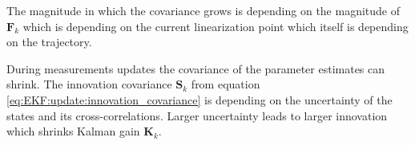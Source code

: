 \documentclass[10pt,a4paper]{article}
\renewcommand{\d}[1]{\ensuremath{\operatorname{d}\!{#1}}}
\begin{document}
The magnitude in which the covariance grows is depending on the magnitude of $\mathbf{F}_k$ which is depending on the current linearization point which itself is depending on the trajectory. 

During measurements updates the covariance of the parameter estimates can shrink. The innovation covariance $\mathbf{S}_k$ from equation \ref{eq:EKF:update:innovation_covariance} is depending on the uncertainty of the states and its cross-correlations. Larger uncertainty leads to larger innovation which shrinks Kalman gain $\mathbf{K}_k$.  

\printbibliography
\end{document}
